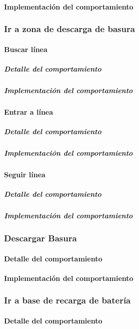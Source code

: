 \paragraph{Implementaci\'on del comportamiento}

\subsubsection{Ir a zona de descarga de basura}
\label{go_to_unload_zone}

\paragraph{Buscar l\'inea}
\label{find_line}
\subparagraph{Detalle del comportamiento}
\subparagraph{Implementaci\'on del comportamiento}

\paragraph{Entrar a l\'inea}
\label{enter_line}
\subparagraph{Detalle del comportamiento}
\subparagraph{Implementaci\'on del comportamiento}

\paragraph{Seguir l\'inea}
\label{follow_line}
\subparagraph{Detalle del comportamiento}
\subparagraph{Implementaci\'on del comportamiento}

\subsubsection{Descargar Basura}
\label{unload_garbage}
\paragraph{Detalle del comportamiento}
\paragraph{Implementaci\'on del comportamiento}

\subsubsection{Ir a base de recarga de bater\'ia}
\label{go_to_recharge}
\paragraph{Detalle del comportamiento}
